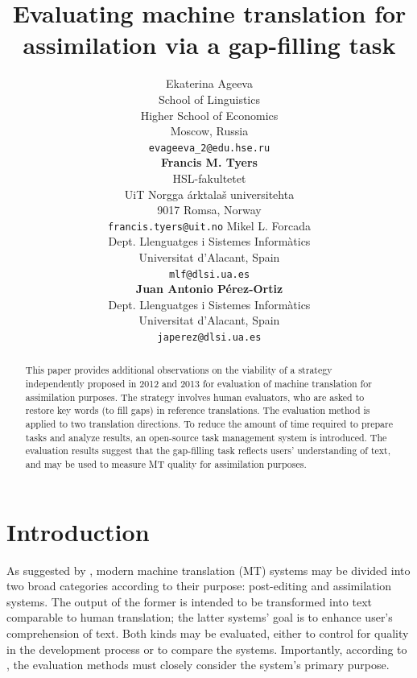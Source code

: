 \documentclass[11pt]{article}
\title{Evaluating machine translation for assimilation via a gap-filling task}
\author{Ekaterina Ageeva\\
  School of Linguistics\\
  Higher School of Economics\\
  Moscow, Russia\\
  {\tt evageeva\_2@edu.hse.ru}\\[2ex]
  \textbf{Francis M. Tyers}\\
  HSL-fakultetet\\ 
  UiT Norgga \'{a}rktala\v{s} universitehta \\
  9017 Romsa, Norway \\
  {\tt francis.tyers@uit.no}
  \And
  Mikel L. Forcada\\
  Dept. Llenguatges i Sistemes Inform\`{a}tics\\
  Universitat d'Alacant, Spain \\
  {\tt mlf@dlsi.ua.es}  \\[2ex]
  \textbf{Juan Antonio P\'{e}rez-Ortiz} \\
  Dept. Llenguatges i Sistemes Inform\`{a}tics\\
  Universitat d'Alacant, Spain \\
  {\tt japerez@dlsi.ua.es}
}
\date{}
\newcommand{\comment}[1]{\marginpar{\scriptsize\sf \textcolor{blue}{#1}}}
\begin{document}
\maketitle
\renewcommand{\baselinestretch}{0.97} %
\comment{EA: has not it first been used in trosterud12?}
\begin{abstract}
  This paper provides additional observations on the viability of a
  strategy independently proposed in 2012 and 2013 for evaluation of
  machine translation for assimilation purposes. The strategy involves
  human evaluators, who are asked to restore key words (to fill gaps) in
  reference translations. The evaluation method is applied to two translation
  directions.\comment{MLF: directions \(\to\) language pairs?} To reduce the amount of time required to prepare tasks
  and analyze results, an open-source task management system is
  introduced. The evaluation results suggest that the gap-filling task
  reflects users' understanding of text,\comment{MLF: ``suggests''? I think this is what we assume to interpret our results: how about ``shows''? We don't show correlation with other evaluation.} and may be used to measure MT
  quality for assimilation purposes.
\end{abstract}

\section{Introduction}

As suggested by \citet{church93}, modern machine translation (MT) systems may
be divided into two broad categories according to their purpose: post-editing and assimilation systems. The output of the former is intended to be transformed into text comparable to human translation; the latter systems' goal is to enhance user's comprehension of text. Both kinds may be evaluated, either to control for quality in the development process or to compare the systems. Importantly, according to \citet{church93}, the evaluation methods must closely consider the system's primary purpose.
\end{document}
